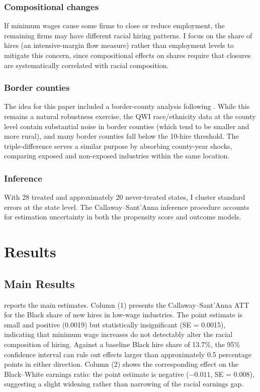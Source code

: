 \documentclass[12pt]{article}
\begin{document}
\subsubsection*{Compositional changes}  If minimum wages cause some firms to close or reduce employment, the remaining firms may have different racial hiring patterns. I focus on the share of hires (an intensive-margin flow measure) rather than employment levels to mitigate this concern, since compositional effects on shares require that closures are systematically correlated with racial composition.

\subsubsection*{Border counties}  The idea for this paper included a border-county analysis following \citet{dube2010minimum}. While this remains a natural robustness exercise, the QWI race/ethnicity data at the county level contain substantial noise in border counties (which tend to be smaller and more rural), and many border counties fall below the 10-hire threshold. The triple-difference serves a similar purpose by absorbing county-year shocks, comparing exposed and non-exposed industries within the same location.

\subsubsection*{Inference}  With 28 treated and approximately 20 never-treated states, I cluster standard errors at the state level. The Callaway--Sant'Anna inference procedure accounts for estimation uncertainty in both the propensity score and outcome models.


\section{Results}

\subsection{Main Results}



 reports the main estimates. Column (1) presents the Callaway--Sant'Anna ATT for the Black share of new hires in low-wage industries. The point estimate is small and positive (0.0019) but statistically insignificant (SE = 0.0015), indicating that minimum wage increases do not detectably alter the racial composition of hiring. Against a baseline Black hire share of 13.7\%, the 95\% confidence interval can rule out effects larger than approximately 0.5 percentage points in either direction. Column (2) shows the corresponding effect on the Black--White earnings ratio: the point estimate is negative ($-0.011$, SE = 0.008), suggesting a slight widening rather than narrowing of the racial earnings gap.
\end{document}
